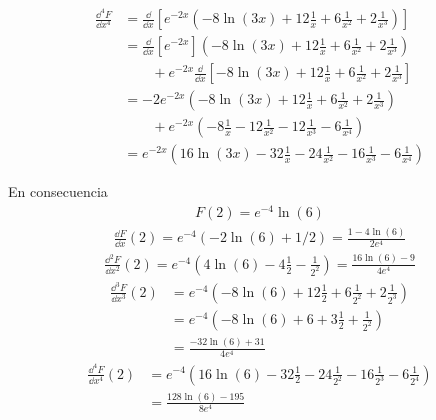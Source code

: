\documentclass{article}
\begin{document}
  \begin{align}
    \frac{\dd^4 F}{\dd x^4}
    &=
    \frac{\dd}{\dd x} \left[
      e^{- 2 x} \left(
        - 8 \ln(3 x)
        + 12 \frac{1}{x}
        + 6 \frac{1}{x^2}
        + 2 \frac{1}{x^3}
      \right)
    \right]
    \\
    &=
    \frac{\dd}{\dd x} [e^{- 2 x}] \left(
      - 8 \ln(3 x)
      + 12 \frac{1}{x}
      + 6 \frac{1}{x^2}
      + 2 \frac{1}{x^3}
    \right)
    \\
    &\qquad
      + e^{- 2 x} \frac{\dd}{\dd x} \left[
        - 8 \ln(3 x)
        + 12 \frac{1}{x}
        + 6 \frac{1}{x^2}
        + 2 \frac{1}{x^3}
      \right]
    \\
    &=
    - 2 e^{- 2 x} \left(
      - 8 \ln(3 x)
      + 12 \frac{1}{x}
      + 6 \frac{1}{x^2}
      + 2 \frac{1}{x^3}
    \right)
    \\
    &\qquad
      + e^{- 2 x} \left(
        - 8 \frac{1}{x}
        - 12 \frac{1}{x^2}
        - 12 \frac{1}{x^3}
        - 6 \frac{1}{x^4}
      \right)
    \\
    &=
    e^{- 2 x} \left(
      16 \ln(3 x)
      - 32 \frac{1}{x}
      - 24 \frac{1}{x^2}
      - 16 \frac{1}{x^3}
      - 6 \frac{1}{x^4}
    \right)
  \end{align}
  
  En consecuencia
  \begin{align}
    F(2) 
    = e^{- 4} \ln(6)
  \end{align}
  \begin{align}
    \frac{\dd F}{\dd x}(2) 
    = 
    e^{- 4} \left(
      - 2 \ln(6) 
      + 1/2
    \right)
    =
    \frac{1 - 4 \ln(6)}{2 e^4}
  \end{align}
  \begin{align}
    \frac{\dd^2 F}{\dd x^2}(2)
    =
    e^{- 4} \left(
      4 \ln(6) 
      - 4 \frac{1}{2} 
      - \frac{1}{2^2}
    \right)
    =
    \frac{16 \ln(6) - 9}{4 e^4}
  \end{align}
  \begin{align}
    \frac{\dd^3 F}{\dd x^3}(2)
    &=
    e^{- 4} \left(
      - 8 \ln(6)
      + 12 \frac{1}{2}
      + 6 \frac{1}{2^2}
      + 2 \frac{1}{2^3}
    \right)
    \\
    &=
    e^{- 4} \left(
      - 8 \ln(6)
      + 6 
      + 3 \frac{1}{2}
      + \frac{1}{2^2}
    \right)
    \\
    &=
    \frac{- 32 \ln(6) + 31}{4 e^4}
  \end{align}
  \begin{align}
    \frac{\dd^4 F}{\dd x^4}(2)
    &=
    e^{- 4} \left(
      16 \ln(6)
      - 32 \frac{1}{2}
      - 24 \frac{1}{2^2}
      - 16 \frac{1}{2^3}
      - 6 \frac{1}{2^4}
    \right)
    \\
    &=
    \frac{128 \ln(6) - 195}{8 e^4}
  \end{align}
  
\end{document}
